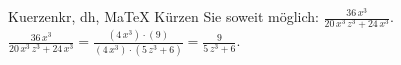 \begin{MAufgabe}{Kuerzen}{kr, dh, MaTeX}
K\"urzen Sie soweit m\"oglich: $\frac{36\, x^3}{20\, x^3\, z^3 + 24\, x^3}$.\\ 
\ifLsg\MLoesung
\quad $\frac{36\, x^3}{20\, x^3\, z^3 + 24\, x^3}=\frac{(4\, x^3)\cdot(9)}{(4\, x^3)\cdot(5\, z^3 + 6)}=\frac{9}{5\, z^3 + 6}$.\else\relax\fi
 \end{MAufgabe}